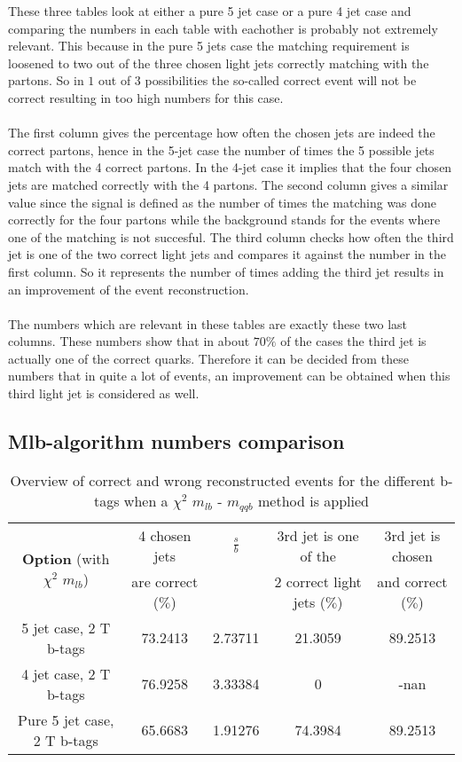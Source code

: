 These three tables look at either a pure 5 jet case or a pure 4 jet case and comparing the numbers in each table with eachother is probably not extremely relevant. This because in the pure 5 jets case the matching requirement is loosened to two out of the three chosen light jets correctly matching with the partons. So in $1$ out of $3$ possibilities the so-called correct event will not be correct resulting in too high numbers for this case.\\
\\
The first column gives the percentage how often the chosen jets are indeed the correct partons, hence in the 5-jet case the number of times the 5 possible jets match with the 4 correct partons. In the 4-jet case it implies that the four chosen jets are matched correctly with the 4 partons. The second column gives a similar value since the signal is defined as the number of times the matching was done correctly for the four partons while the background stands for the events where one of the matching is not succesful. The third column checks how often the third jet is one of the two correct light jets and compares it against the number in the first column. So it represents the number of times adding the third jet results in an improvement of the event reconstruction. \\
\\
The numbers which are relevant in these tables are exactly these two last columns. These numbers show that in about $70 \%$ of the cases the third jet is actually one of the correct quarks. Therefore it can be decided from these numbers that in quite a lot of events, an improvement can be obtained when this third light jet is considered as well.

\subsection{Mlb-algorithm numbers comparison}
  \begin{table}[!h] 
 \begin{tabular}{c|c|c|c|c} 
\multirow{2}{*}{\textbf{Option} (with $\chi^{2}$ $m_{lb}$)} & 4 chosen jets & $\frac{s}{b}$ & 3rd jet is one of the & 3rd jet is chosen \\ & are correct ($\%$)    & 	             & 2 correct light jets ($\%$) &  and correct ($\%$)	  \\ \hline 
 5 jet case,      2 T b-tags              & 73.2413 & 2.73711 & 21.3059 & 89.2513 \\ 
 4 jet case,      2 T b-tags              & 76.9258 & 3.33384 & 0 & -nan \\ 
 Pure 5 jet case, 2 T b-tags              & 65.6683 & 1.91276 & 74.3984 & 89.2513 \\ 
 \end{tabular} 
 \caption{Overview of correct and wrong reconstructed events for the different b-tags when a $\chi^{2}$ $m_{lb}$ - $m_{qqb}$ method is applied} 
 \end{table} 
 
